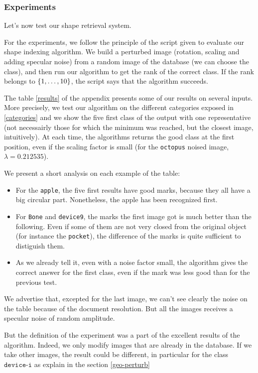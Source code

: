 \subsubsection{Experiments}

Let's now test our shape retrieval system.

For the experiments, we follow the principle of the script given to evaluate our shape indexing algorithm. We build a perturbed image (rotation, scaling and adding specular noise) from a random image of the database (we can choose the class), and then run our algorithm to get the rank of the correct class. If the rank belongs to $\left\{ 1,\dots,10 \right\}$, the script says that the algorithm succeeds.

The table \ref{results} of the appendix presents some of our results on several inputs. More precisely, we test our algorithm on the different categories exposed in \ref{categories} and we show the five first class of the output with one representative (not necessairly those for which the minimum was reached, but the closest image, intuitively). At each time, the algorithms returns the good class at the first position, even if the scaling factor is small (for the \texttt{octopus} noised image, $\lambda = 0.212535$).

We present a short analysis on each example of the table:

\begin{itemize}
	\item For the \texttt{apple}, the five first results have good marks, because they all have a big circular part. Nonetheless, the apple has been recognized first.
	\item For \texttt{Bone} and \texttt{device9}, the marks the first image got is much better than the following. Even if some of them are not very closed from the original object (for instance the \texttt{pocket}), the difference of the marks is quite sufficient to distiguish them.
	\item As we already tell it, even with a noise factor small, the algorithm gives the correct answer for the first class, even if the mark was less good than for the previous test.
\end{itemize}

We advertise that, excepted for the last image, we can't see clearly the noise on the table because of the document resolution. But all the images receives a specular noise of random amplitude.

But the definition of the experiment was a part of the excellent results of the algorithm. Indeed, we only modify images that are already in the database. If we take other images, the result could be different, in particular for the class $\texttt{device-i}$ as explain in the section \ref{geo-perturb}


